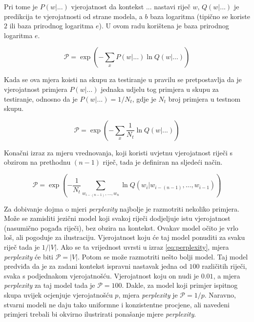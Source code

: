 \documentclass[times, utf8, diplomski, numeric]{fer}
\begin{document}
Pri tome je $P(w | ...)$ vjerojatnost da kontekst $...$ nastavi riječ $w$, $Q(w | ...)$ je predikcija te vjerojatnosti od strane modela, a $b$ baza logaritma (tipično se koriste $2$ ili baza prirodnog logaritma $e$). U ovom radu korištena je baza prirodnog logaritma $e$.

\[
\mathcal{P} = \exp\left(- \sum_x P(w | ...) \ln Q(w | ...) \right)
\]

Kada se ova mjera koisti na skupu za testiranje u pravilu se pretpostavlja da je vjerojatnost primjera $P(w | ...)$ jednaka udjelu tog primjera u skupu za testiranje, odnosno da je $P(w | ...) = 1 / N_t$, gdje je $N_t$ broj primjera u testnom skupu.

\[
\mathcal{P} = \exp\left(- \sum_x \frac{1}{N_t} \ln Q(w | ...) \right)
\]

Konačni izraz za mjeru vrednovanja, koji koristi uvjetnu vjerojatnost riječi s obzirom na prethodnu $(n - 1)$ riječ, tada je definiran na sljedeći način.

\begin{equation}
\label{eq:perplexity}
\mathcal{P} = \exp\left(- \frac{1}{N_t} \sum_{w_{i - (n - 1)}, ..., w_n}  \ln Q(w_i | w_{i - (n - 1)}, ... , w_{i - 1}) \right)
\end{equation}

Za dobivanje dojma o mjeri \textit{perplexity} najbolje je razmotriti nekoliko primjera. Može se zamisliti jezični model koji svakoj riječi dodjeljuje istu vjerojatnost (nasumično pogađa riječi), bez obzira na kontekst. Ovakav model očito je vrlo loš, ali pogoduje za ilustraciju. Vjerojatnost koju će taj model ponuditi za svaku riječ tada je $1 / |V|$. Ako se ta vrijednost uvrsti u izraz \ref{eq:perplexity}, mjera \textit{perplexity} će biti $\mathcal{P} = |V|$. Potom se može razmotriti nešto bolji model. Taj model predviđa da je za zadani kontekst ispravni nastavak jedna od $100$ različitih riječi, svaka s podjednakom vjerojatnošću. Vjerojatnost koju on nudi je $0.01$, a mjera \textit{perplexity} za taj model tada je $\mathcal{P} = 100$. Dakle, za model koji primjer ispitnog skupa uvijek ocjenjuje vjerojatnošću $p$, mjera \textit{perplexity} je $\mathcal{P} = 1 / p$. Naravno, stvarni modeli ne daju tako uniformne i konzistentne procjene, ali navedeni primjeri trebali bi okvirno ilustrirati ponašanje mjere \textit{perplexity}.
\end{document}
